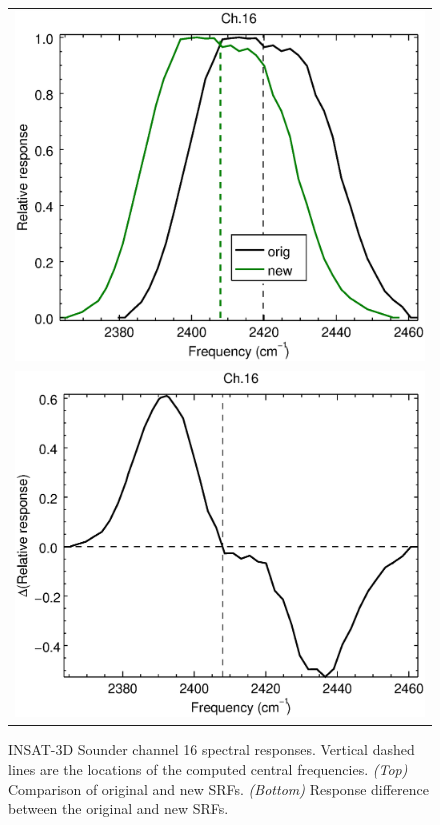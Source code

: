 \begin{figure}[H]
  \centering
  \begin{tabular}{c}
    \includegraphics[scale=0.55]{graphics/sndr/srf/sndr_insat3d-16.eps} \\
    \includegraphics[scale=0.55]{graphics/sndr/srf/sndr_insat3d-16.difference.eps}
  \end{tabular}
  \caption{INSAT-3D Sounder channel 16 spectral responses. Vertical dashed lines are the locations of the computed central frequencies. \emph{(Top)} Comparison of original and new SRFs. \emph{(Bottom)} Response difference between the original and new SRFs.}
  \label{fig:sndr_ch16}
\end{figure}


